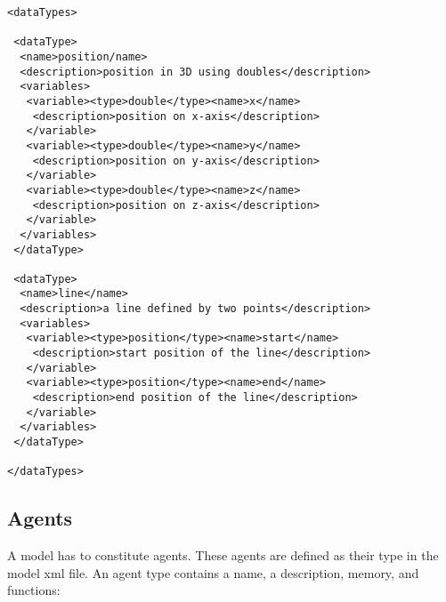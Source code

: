 \begin{mylisting}
\begin{verbatim}
<dataTypes>

 <dataType>
  <name>position/name>
  <description>position in 3D using doubles</description>
  <variables>
   <variable><type>double</type><name>x</name>
    <description>position on x-axis</description>
   </variable>
   <variable><type>double</type><name>y</name>
    <description>position on y-axis</description>
   </variable>
   <variable><type>double</type><name>z</name>
    <description>position on z-axis</description>
   </variable>
  </variables>
 </dataType>

 <dataType>
  <name>line</name>
  <description>a line defined by two points</description>
  <variables>
   <variable><type>position</type><name>start</name>
    <description>start position of the line</description>
   </variable>
   <variable><type>position</type><name>end</name>
    <description>end position of the line</description>
   </variable>
  </variables>
 </dataType>

</dataTypes>
\end{verbatim}
\end{mylisting}

\subsection{Agents}

A model has to constitute agents. These agents are defined as their type in the model xml file. An agent type contains a name, a description, memory, and functions:

